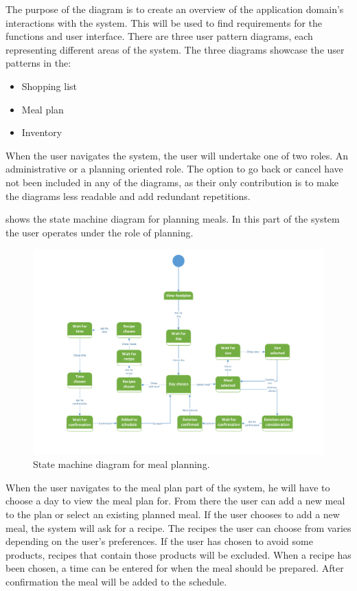 The purpose of the diagram is to create an overview of the application domain's interactions with the system. This will be used to find requirements for the functions and user interface. There are three user pattern diagrams, each representing different areas of the system. The three diagrams showcase the user patterns in the:

\begin{itemize}
\item{Shopping list}
\item{Meal plan}
\item{Inventory}
\end{itemize}

When the user navigates the system, the user will undertake one of two roles. An administrative or a planning oriented role.
The option to go back or cancel have not been included in any of the diagrams, as their only contribution is to make the diagrams less readable and add redundant repetitions.

 shows the state machine diagram for planning meals. In this part of the system the user operates under the role of planning.

\begin{figure}[H]
	\centering
	\includegraphics[width=1.0\textwidth]{ApplicationDomain/spViewFoodPlan.pdf} 
	\caption{State machine diagram for meal planning.}
	\label{Foodplan_Figure}
\end{figure}
When the user navigates to the meal plan part of the system, he will have to choose a day to view the meal plan for. From there the user can add a new meal to the plan or select an existing planned meal. If the user chooses to add a new meal, the system will ask for a recipe. The recipes the user can choose from varies depending on the user's preferences. If the user has chosen to avoid some products, recipes that contain those products will be excluded. When a recipe has been chosen, a time can be entered for when the meal should be prepared. After confirmation the meal will be added to the schedule.

